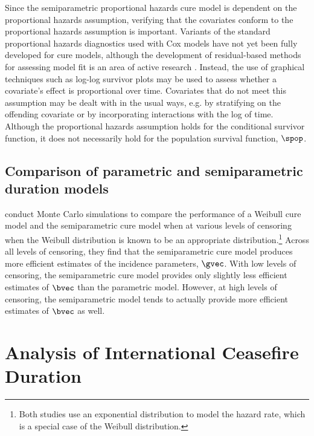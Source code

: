 \documentclass{article}
\begin{document}
Since the semiparametric proportional hazards cure model is dependent on the proportional hazards assumption, verifying that the covariates conform to the proportional hazards assumption is important. 
Variants of the standard proportional hazards diagnostics used with Cox models have not yet been fully developed for cure models, although the development of residual-based methods for assessing model fit is an area of active research \citep{peng2017, ramires2018}. Instead, the use of graphical techniques such as log-log survivor plots may be used to assess whether a covariate's effect is proportional over time. Covariates that do not meet this assumption may be dealt with in the usual ways, e.g. by stratifying on the offending covariate or by incorporating interactions with the log of time. Although the proportional hazards assumption holds for the conditional survivor function, it does not necessarily hold for the population survival function, $\spop$.

\subsection{Comparison of parametric and semiparametric duration models}
\citet{kuk1992, sy2000} conduct Monte Carlo simulations to compare the performance of a Weibull cure model and the semiparametric cure model when at various levels of censoring when the Weibull distribution is known to be an appropriate distribution.\footnote{Both studies use an exponential distribution to model the hazard rate, which is a special case of the Weibull distribution.} Across all levels of censoring, they find that the semiparametric cure model produces more efficient estimates of the incidence parameters, $\gvec$. With low levels of censoring, the semiparametric cure model provides only slightly less efficient estimates of $\bvec$ than the parametric model. However, at high levels of censoring, the semiparametric model tends to actually provide more efficient estimates of $\bvec$ as well.


\section{Analysis of International Ceasefire Duration}
\end{document}
